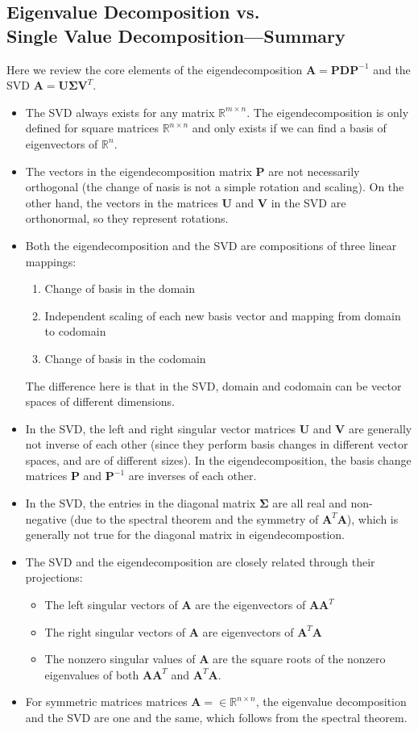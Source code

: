 \documentclass{report}
\begin{document}
\subsection{Eigenvalue Decomposition vs. \\Single Value Decomposition---Summary}%
Here we review the core elements of the eigendecomposition
$\bm{A}=\bm{PDP}^{-1}$ and the SVD $\bm{A}=\bm{U\Sigma V}^T$.
\begin{itemize}
\item The SVD always exists for any matrix $\mathbb{R}^{m\times n}$. The eigendecomposition is only defined for
square matrices $\mathbb{R}^{n\times n}$ and only exists if we can find a basis of eigenvectors of $\mathbb{R}^n$.
\item The vectors in the eigendecomposition matrix $\bm{P}$ are not necessarily orthogonal (the change of
nasis is not a simple rotation and scaling). On the other hand, the vectors in the matrices $\bm{U}$ and $\bm{V}$
in the SVD are orthonormal, so they represent rotations.
\item Both the eigendecomposition and the SVD are compositions of three linear mappings:
\begin{enumerate}
\item Change of basis in the domain
\item Independent scaling of each new basis vector and mapping from domain to codomain
\item Change of basis in the codomain
\end{enumerate}
The difference here is that in the SVD, domain and codomain can be vector spaces of different dimensions.
\item In the SVD, the left and right singular vector matrices $\bm{U}$ and $\bm{V}$ are generally not inverse of
each other (since they perform basis changes in different vector spaces, and are of different sizes). 
In the eigendecomposition, the basis change matrices $\bm{P}$ and $\bm{P}^{-1}$ are inverses of each other.
\item In the SVD, the entries in the diagonal matrix $\bm{\Sigma}$ are all real and non-negative
(due to the spectral theorem and the symmetry of $\bm{A}^T
\bm{A}$), which is
generally not true for the diagonal matrix in eigendecompostion.
\item The SVD and the eigendecomposition are closely related through their projections:
\begin{itemize}
\item The left singular vectors of $\bm{A}$ are the eigenvectors of $\bm{AA}^T$
\item The right singular vectors of $\bm{A}$ are eigenvectors of $\bm{A}^T\bm{A}$
\item The nonzero singular values of $\bm{A}$ are the square roots of the nonzero eigenvalues of both
$\bm{AA}^T$ and $\bm{A}^T\bm{A}$.
\end{itemize}
\item For symmetric matrices matrices $\bm{A}=\in\mathbb{R}^{n\times n}$, the eigenvalue decomposition and the SVD
are one and the same, which follows from the spectral theorem.
\end{itemize}
\newpage
\end{document}
